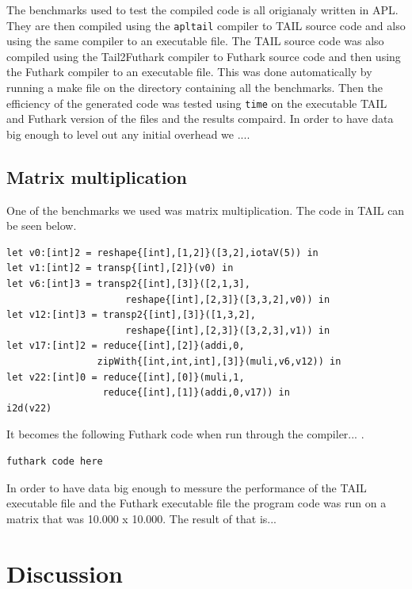 \documentclass[11pt]{article}
\begin{document}
The benchmarks used to test the compiled code is all origianaly written in APL. They are then compiled using the {\tt apltail} compiler to TAIL source code and also using the same compiler to an executable file. The TAIL source code was also compiled using the Tail2Futhark compiler to Futhark source code and then using the Futhark compiler to an executable file. This was done automatically by running a make file on the directory containing all the benchmarks.
Then the efficiency of the generated code was tested using {\tt time} on the executable TAIL and Futhark version of the files and the results compaird. In order to have data big enough to level out any initial overhead we ....\\

\subsection{Matrix multiplication}

One of the benchmarks we used was matrix multiplication. The code in TAIL can be seen below. 

\begin{lstlisting}
let v0:[int]2 = reshape{[int],[1,2]}([3,2],iotaV(5)) in
let v1:[int]2 = transp{[int],[2]}(v0) in
let v6:[int]3 = transp2{[int],[3]}([2,1,3],
                     reshape{[int],[2,3]}([3,3,2],v0)) in
let v12:[int]3 = transp2{[int],[3]}([1,3,2],
                     reshape{[int],[2,3]}([3,2,3],v1)) in
let v17:[int]2 = reduce{[int],[2]}(addi,0,
                zipWith{[int,int,int],[3]}(muli,v6,v12)) in
let v22:[int]0 = reduce{[int],[0]}(muli,1,
                 reduce{[int],[1]}(addi,0,v17)) in
i2d(v22)
\end{lstlisting}

It becomes the following Futhark code when run through the compiler...
.
\begin{lstlisting}
futhark code here
\end{lstlisting}

In order to have data big enough to messure the performance of the TAIL executable file and the Futhark executable file the program code was run on a matrix that was 10.000 x 10.000. 
The result of that is...

\section{Discussion}
\end{document}
